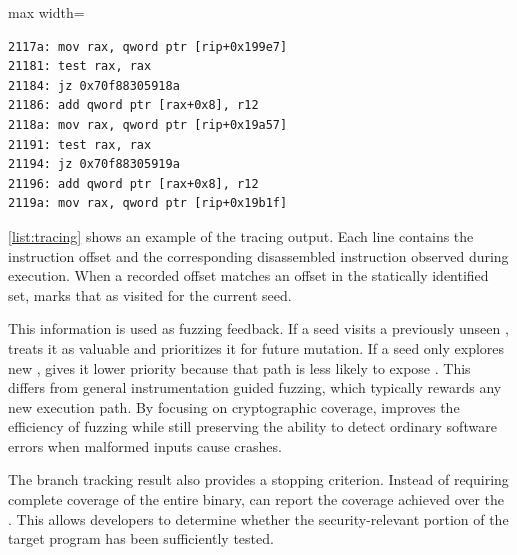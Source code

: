 \begin{ZZlisting}[H]
\caption{Example of runtime instruction offsets recorded by the dynamic branch tracker.}
\vspace*{12pt}
\centering
\begin{adjustbox}{max width=\textwidth}
\begin{CenteredBox}
\begin{minipage}{0.96\textwidth}
\begin{lstlisting}[style=asmstyle]
2117a: mov rax, qword ptr [rip+0x199e7]
21181: test rax, rax
21184: jz 0x70f88305918a
21186: add qword ptr [rax+0x8], r12
2118a: mov rax, qword ptr [rip+0x19a57]
21191: test rax, rax
21194: jz 0x70f88305919a
21196: add qword ptr [rax+0x8], r12
2119a: mov rax, qword ptr [rip+0x19b1f]
\end{lstlisting}
\end{minipage}
\end{CenteredBox}
\end{adjustbox}
\label{list:tracing}
\end{ZZlisting}


\autoref{list:tracing} shows an example of the tracing output. Each line contains the instruction offset and the corresponding disassembled instruction observed during execution. When a recorded offset matches an offset in the statically identified \cryptobranch set, \greyboxfuzz marks that \cryptobranch as visited for the current seed.

This information is used as fuzzing feedback. If a seed visits a previously unseen \cryptobranch, \greyboxfuzz treats it as valuable and prioritizes it for future mutation. If a seed only explores new \programbranch, \greyboxfuzz gives it lower priority because that path is less likely to expose \logicerror. This differs from general instrumentation guided fuzzing, which typically rewards any new execution path. By focusing on cryptographic coverage, \greyboxfuzz improves the efficiency of fuzzing while still preserving the ability to detect ordinary software errors when malformed inputs cause crashes. 

The branch tracking result also provides a stopping criterion. Instead of requiring complete coverage of the entire binary, \greyboxfuzz can report the coverage achieved over the \cryptobranch. This allows developers to determine whether the security-relevant portion of the target program has been sufficiently tested.